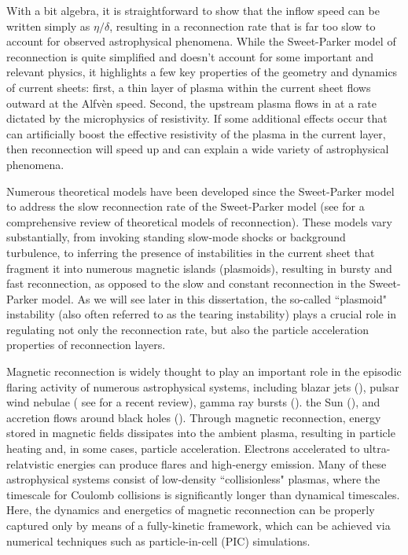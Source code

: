 With a bit algebra, it is straightforward to show that the inflow speed can be written simply as $\eta/\delta$, resulting in a reconnection rate that is far too slow to account for observed astrophysical phenomena.  While the Sweet-Parker model of reconnection is quite simplified and doesn't account for some important and relevant physics, it highlights a few key properties of the geometry and dynamics of current sheets: first, a thin layer of plasma within the current sheet flows outward at the Alfv\`en speed.  Second, the upstream plasma flows in at a rate dictated by the microphysics of resistivity.  If some additional effects occur that can artificially boost the effective resistivity of the plasma in the current layer, then reconnection will speed up and can explain a wide variety of astrophysical phenomena. 

Numerous theoretical models have been developed since the Sweet-Parker model to address the slow reconnection rate of the Sweet-Parker model (see \citealt{loureiro2016} for a comprehensive review of theoretical models of reconnection).  These models vary substantially, from invoking standing slow-mode shocks or background turbulence, to inferring the presence of instabilities in the current sheet that fragment it into numerous magnetic islands (plasmoids), resulting in bursty and fast reconnection, as opposed to the slow and constant reconnection in the Sweet-Parker model.  As we will see later in this dissertation, the so-called ``plasmoid" instability (also often referred to as the tearing instability) plays a crucial role in regulating not only the reconnection rate, but also the particle acceleration properties of reconnection layers.
 

Magnetic reconnection is widely thought to play an important role in the episodic flaring activity of numerous astrophysical systems, including blazar jets (\citealt{giannios2013, petropoulou2016, nalewajko2016}), pulsar wind nebulae (\citealt{coroniti1990, lyubarsky2001, zenitani2001, kirk2003, contopoulos2007, petri2008, sironi2011, cerutti2012,cerutti2014,cerutti2017, philippov2014} see \citealt{sironi2017} for a recent review), gamma ray bursts (\citealt{thompson1994, thompson2006, usov1994, spruit2001, drenkhahn2002, lyutikov2003, giannios2008}). the Sun (\citealt{forbes1996, yokoyama2001, shibata2011}), and accretion flows around black holes (\citealt{galeev1979, dimatteo1998, uzdensky2008, li2015, ball2016, li2017}).  Through magnetic reconnection, energy stored in magnetic fields dissipates into the ambient plasma, resulting in particle heating and, in some cases, particle acceleration.  Electrons accelerated to ultra-relatvistic energies can produce flares and high-energy emission.  Many of these astrophysical systems consist of low-density ``collisionless" plasmas, where the timescale for Coulomb collisions is significantly longer than dynamical timescales.  Here, the dynamics and energetics of magnetic reconnection can be properly captured only by means of a fully-kinetic framework, which can be achieved via numerical techniques such as particle-in-cell (PIC) simulations.


